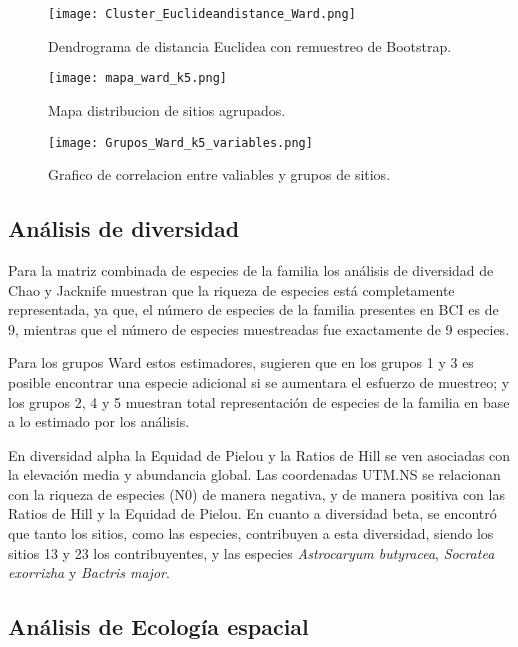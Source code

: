 \documentclass[11pt,]{article}
\begin{document}
\begin{figure}
\centering
\texttt{[image: Cluster\_Euclideandistance\_Ward.png]}
\caption{Dendrograma de distancia Euclidea con remuestreo de Bootstrap.
\label{fig:Cluster_Euclideandistance_Ward}}
\end{figure}

\begin{figure}
\centering
\texttt{[image: mapa\_ward\_k5.png]}
\caption{Mapa distribucion de sitios agrupados.
\label{fig:mapa_ward_k5}}
\end{figure}

\begin{figure}
\centering
\texttt{[image: Grupos\_Ward\_k5\_variables.png]}
\caption{Grafico de correlacion entre valiables y grupos de sitios.
\label{fig:Grupos_Ward_k5_variables}}
\end{figure}

\subsection{Análisis de diversidad}\label{anuxe1lisis-de-diversidad}

Para la matriz combinada de especies de la familia los análisis de
diversidad de Chao y Jacknife muestran que la riqueza de especies está
completamente representada, ya que, el número de especies de la familia
presentes en BCI es de 9, mientras que el número de especies muestreadas
fue exactamente de 9 especies.

Para los grupos Ward estos estimadores, sugieren que en los grupos 1 y 3
es posible encontrar una especie adicional si se aumentara el esfuerzo
de muestreo; y los grupos 2, 4 y 5 muestran total representación de
especies de la familia en base a lo estimado por los análisis.

En diversidad alpha la Equidad de Pielou y la Ratios de Hill se ven
asociadas con la elevación media y abundancia global. Las coordenadas
UTM.NS se relacionan con la riqueza de especies (N0) de manera negativa,
y de manera positiva con las Ratios de Hill y la Equidad de Pielou. En
cuanto a diversidad beta, se encontró que tanto los sitios, como las
especies, contribuyen a esta diversidad, siendo los sitios 13 y 23 los
contribuyentes, y las especies \emph{Astrocaryum butyracea},
\emph{Socratea exorrizha} y \emph{Bactris major}.

\subsection{Análisis de Ecología
espacial}\label{anuxe1lisis-de-ecologuxeda-espacial}
\end{document}
